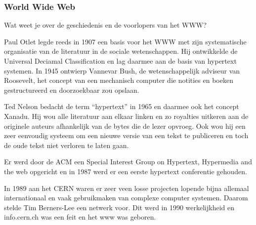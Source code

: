 \documentclass[../main.tex]{subfiles}
\begin{document}
\subsubsection{World Wide Web}
\begin{question}
Wat weet je over de geschiedenis en de voorlopers van het WWW?
\end{question}
\begin{solution}
Paul Otlet legde reeds in 1907 een basis voor het WWW met zijn systematische organisatie van de literatuur in de sociale wetenschappen.
Hij ontwikkelde de Universal Deciamal Classification en lag daarmee aan de basis van hypertext systemen.
In 1945 ontwierp Vannevar Bush, de wetenschappelijk adviseur van Roosevelt, het concept van een mechanisch  computer die notities en boeken gestructureerd en doorzoekbaar zou opslaan.

Ted Nelson bedacht de term ``hypertext'' in 1965 en daarmee ook het concept Xanadu.
Hij wou alle literatuur aan elkaar linken en zo royalties uitkeren aan de originele auteurs afhankelijk van de bytes die de lezer opvroeg.
Ook wou hij een zeer eenvoudig systeem om een nieuwe versie van een tekst te publiceren en toch de oude tekst niet verloren te laten gaan.

Er werd door de ACM een Special Interest Group on Hypertext, Hypermedia and the web opgericht en in 1987  werd er een eerste hypertext conferentie gehouden.

In 1989 aan het CERN waren er zeer veen losse projecten lopende bijna allemaal internationaal en vaak gebruikmaken van complexe computer systemen.
Daarom stelde Tim Berners-Lee een netwerk voor.
Dit werd in 1990 werkelijkheid en info.cern.ch was een feit en het www was geboren.
\end{solution}
\end{document}
